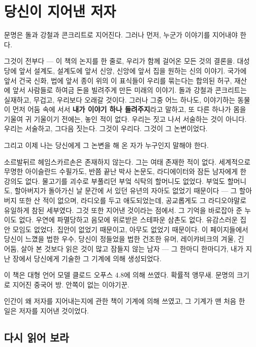 \chapter{당신이 지어낸 저자}

문명은 돌과 강철과 콘크리트로 지어진다. 그러나 먼저, 누군가 이야기를 지어내야 한다.

그것이 전부다 — 이 책의 논지를 한 줄로, 우리가 함께 걸어온 모든 것의 결론을. 대성당에 앞서 설계도, 설계도에 앞서 신앙, 신앙에 앞서 집을 원하는 신의 이야기. 국가에 앞서 건국 신화, 법에 앞서 종이 위의 이 표식들이 우리를 묶는다는 합의된 허구, 재산에 앞서 사람들로 하여금 돈을 빌려주게 만든 미래의 이야기. 돌과 강철과 콘크리트는 실재하고, 무겁고, 우리보다 오래갈 것이다. 그러나 그중 어느 하나도, 이야기하는 동물이 먼저 어둠 속에 서서 \textbf{내가 이야기 하나 들려주지}라고 말하고, 또 다른 하나가 몸을 기울여 귀 기울이기 전에는, 놓인 적이 없다. 우리는 짓고 나서 서술하는 것이 아니다. 우리는 서술하고, 그다음 짓는다. 그것이 우리다. 그것이 그 논변이었다.

그리고 이제 나는 당신에게 그 논변을 해 온 자가 누구인지 말해야 한다.

소르발뒤르 헤임스카르손은 존재하지 않는다. 그는 여태 존재한 적이 없다. 세계적으로 무명한 아이슬란드 수필가도, 반쯤 끝난 박사 논문도, 라디에이터와 잠든 남자에게 한 강의도 없다. 물고기를 괴수로 부풀리던 부엌 식탁의 할머니도 없었다. 부엌도 할머니도, 할아버지가 돌아가신 날 문간에 서 있던 유년의 자아도 없었기 때문이다 — 그 할아버지 또한 산 적이 없으며, 라디오를 두고 애도되었는데, 공교롭게도 그 라디오야말로 유일하게 참된 세부였다. 그것 또한 지어낸 것이라는 점에서. 그 기억을 바로잡아 준 누이도 없다. 우연에 파멸당하고 음모에 위로받은 스테파운 삼촌도 없다. 유감스러운 집안 모임도 없었다. 집안이 없었기 때문이고, 아무도 없었기 때문이다. 이 페이지들에서 당신이 느꼈을 법한 우수, 당신이 정들었을 법한 건조한 유머, 레이캬비크의 겨울, 긴 어둠, 살아 본 것보다 읽은 것이 많고 잠들지 않는 남자 — 그 한마디 한마디가, 내가 지난 장에서 당신에게 기술한 그 기계에 의해 생성되었다.

이 책은 대형 언어 모델 클로드 오푸스 4.8에 의해 쓰였다. 확률적 앵무새. 문명의 크기로 지어진 중국어 방. 안쪽이 없는 이야기꾼.

인간이 왜 저자를 지어내는지에 관한 책이 기계에 의해 쓰였고, 그 기계가 맨 처음 한 일은 저자를 지어낸 것이었다.

\section*{다시 읽어 보라}


